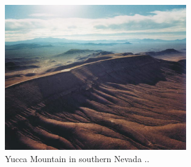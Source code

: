 \begin{figure}[htbp!]
  \begin{center}
    \includegraphics[width=0.7\textwidth]{yucca_site.eps}
  \end{center}
  \caption{Yucca Mountain in southern Nevada .. }
  \label{fig:yucca_site}
\end{figure}

